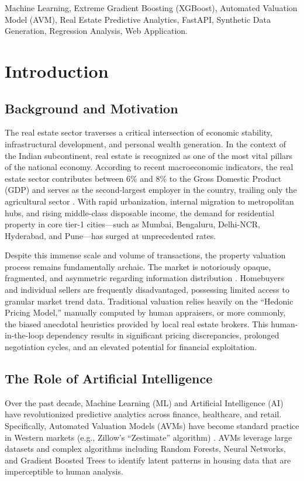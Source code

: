 \documentclass[conference]{IEEEtran}
\begin{document}
\begin{IEEEkeywords}
Machine Learning, Extreme Gradient Boosting (XGBoost), Automated Valuation Model (AVM), Real Estate Predictive Analytics, FastAPI, Synthetic Data Generation, Regression Analysis, Web Application.
\end{IEEEkeywords}

\section{Introduction}

\subsection{Background and Motivation}
The real estate sector traverses a critical intersection of economic stability, infrastructural development, and personal wealth generation. In the context of the Indian subcontinent, real estate is recognized as one of the most vital pillars of the national economy. According to recent macroeconomic indicators, the real estate sector contributes between 6\% and 8\% to the Gross Domestic Product (GDP) and serves as the second-largest employer in the country, trailing only the agricultural sector \cite{ibef}. With rapid urbanization, internal migration to metropolitan hubs, and rising middle-class disposable income, the demand for residential property in core tier-1 cities—such as Mumbai, Bengaluru, Delhi-NCR, Hyderabad, and Pune—has surged at unprecedented rates. 

Despite this immense scale and volume of transactions, the property valuation process remains fundamentally archaic. The market is notoriously opaque, fragmented, and asymmetric regarding information distribution \cite{nhb}. Homebuyers and individual sellers are frequently disadvantaged, possessing limited access to granular market trend data. Traditional valuation relies heavily on the ``Hedonic Pricing Model,'' manually computed by human appraisers, or more commonly, the biased anecdotal heuristics provided by local real estate brokers. This human-in-the-loop dependency results in significant pricing discrepancies, prolonged negotiation cycles, and an elevated potential for financial exploitation.

\subsection{The Role of Artificial Intelligence}
Over the past decade, Machine Learning (ML) and Artificial Intelligence (AI) have revolutionized predictive analytics across finance, healthcare, and retail. Specifically, Automated Valuation Models (AVMs) have become standard practice in Western markets (e.g., Zillow's ``Zestimate'' algorithm) \cite{zillow}. AVMs leverage large datasets and complex algorithms including Random Forests, Neural Networks, and Gradient Boosted Trees to identify latent patterns in housing data that are imperceptible to human analysis. 
\end{document}
